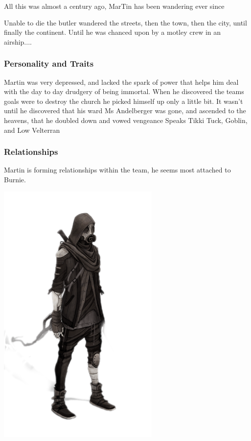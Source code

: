 All this was almost a century ago, MarTin has been wandering ever since    

Unable to die the butler wandered the streets, then the town, then the city, until finally the continent. Until he was chanced upon by a motley crew in an airship....     

\subsubsection{Personality and Traits}

Martin was very depressed, and lacked the spark of power that helps him deal with the day to day drudgery of being immortal. When he discovered the teams goals were to destroy the church he picked himself up only a little bit. It wasn't until he discovered that his ward Ms Andelberger was gone, and ascended to the heavens, that he doubled down and vowed vengeance
Speaks Tikki Tuck, Goblin, and Low Velterran    

\subsubsection{Relationships}

Martin is forming relationships within the team, he seems most attached to Burnie.\bigskip


\begin{center}
\includegraphics[width=80mm]{./content/img/martin.png}
\begin{figure}[h]
\end{figure}
\end{center}

\clearpage
